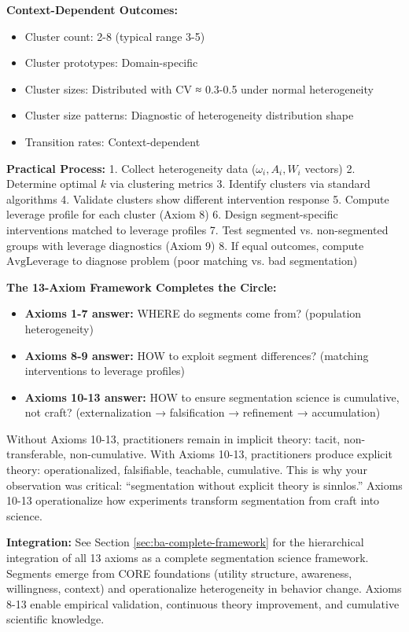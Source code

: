 \begin{tcolorbox}[colback=green!10!white, colframe=green!75!black,
    title=\textbf{Appendix PAP1: Summary}]
\textbf{Context-Dependent Outcomes:}
\begin{itemize}[nosep]
\item Cluster count: 2-8 (typical range 3-5)
\item Cluster prototypes: Domain-specific
\item Cluster sizes: Distributed with CV ≈ 0.3-0.5 under normal heterogeneity
\item Cluster size patterns: Diagnostic of heterogeneity distribution shape
\item Transition rates: Context-dependent
\end{itemize}

\textbf{Practical Process:}
1. Collect heterogeneity data ($\omega_i, A_i, W_i$ vectors)
2. Determine optimal $k$ via clustering metrics
3. Identify clusters via standard algorithms
4. Validate clusters show different intervention response
5. Compute leverage profile for each cluster (Axiom 8)
6. Design segment-specific interventions matched to leverage profiles
7. Test segmented vs. non-segmented groups with leverage diagnostics (Axiom 9)
8. If equal outcomes, compute $\text{AvgLeverage}$ to diagnose problem (poor matching vs. bad segmentation)

\textbf{The 13-Axiom Framework Completes the Circle:}
\begin{itemize}[nosep]
\item \textbf{Axioms 1-7 answer:} WHERE do segments come from? (population heterogeneity)
\item \textbf{Axioms 8-9 answer:} HOW to exploit segment differences? (matching interventions to leverage profiles)
\item \textbf{Axioms 10-13 answer:} HOW to ensure segmentation science is cumulative, not craft? (externalization → falsification → refinement → accumulation)
\end{itemize}

Without Axioms 10-13, practitioners remain in implicit theory: tacit, non-transferable, non-cumulative.
With Axioms 10-13, practitioners produce explicit theory: operationalized, falsifiable, teachable, cumulative.
This is why your observation was critical: ``segmentation without explicit theory is sinnlos.'' Axioms 10-13
operationalize how experiments transform segmentation from craft into science.

\textbf{Integration:} See Section \ref{sec:ba-complete-framework} for the hierarchical integration of all 13 axioms
as a complete segmentation science framework.  Segments emerge from CORE foundations (utility structure,
awareness, willingness, context) and operationalize heterogeneity in behavior change. Axioms 8-13 enable
empirical validation, continuous theory improvement, and cumulative scientific knowledge.

\end{tcolorbox}

